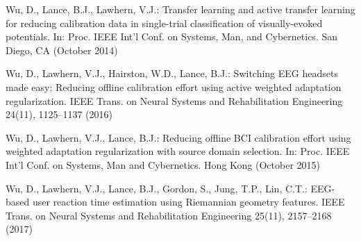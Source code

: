 \documentclass[runningheads]{llncs}
\begin{document}
\begin{thebibliography}{10}
Wu, D., Lance, B.J., Lawhern, V.J.: Transfer learning and active transfer
  learning for reducing calibration data in single-trial classification of
  visually-evoked potentials. In: Proc. {IEEE} Int'l Conf. on Systems, Man, and
  Cybernetics. San Diego, CA (October 2014)

Wu, D., Lawhern, V.J., Hairston, W.D., Lance, B.J.: Switching {EEG} headsets
  made easy: {Reducing} offline calibration effort using active weighted
  adaptation regularization. {IEEE} Trans. on Neural Systems and Rehabilitation
  Engineering  24(11),  1125--1137 (2016)

Wu, D., Lawhern, V.J., Lance, B.J.: Reducing offline {BCI} calibration effort
  using weighted adaptation regularization with source domain selection. In:
  Proc. {IEEE} Int'l Conf. on Systems, Man and Cybernetics. Hong Kong (October
  2015)

Wu, D., Lawhern, V.J., Lance, B.J., Gordon, S., Jung, T.P., Lin, C.T.:
  {EEG}-based user reaction time estimation using {R}iemannian geometry
  features. {IEEE} Trans. on Neural Systems and Rehabilitation Engineering
  25(11),  2157--2168 (2017)

\end{thebibliography}
\end{document}

